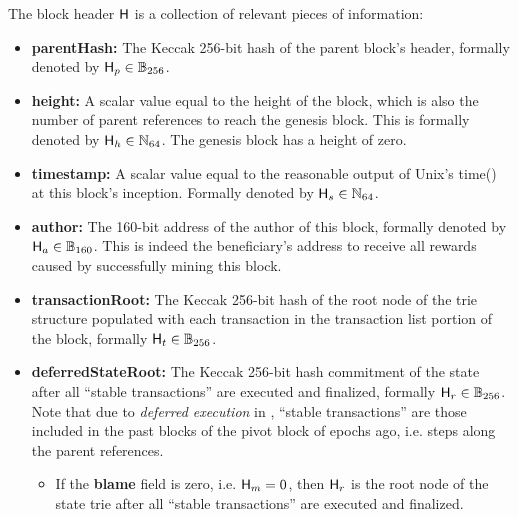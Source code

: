 The block header $\textsf{H}$ is a collection of relevant pieces of information:
\begin{itemize}[nosep]
	\item {\bf parentHash:} The Keccak 256-bit hash of the parent block's header, formally denoted by $\textsf{H}_p\in\mathbb{B}_{256}$.
	

	\item {\bf height:} A scalar value equal to the height of the block, which is also the number of parent references to reach the genesis block. 
	This is formally denoted by $\textsf{H}_h\in \mathbb{N}_{64}$.
	The genesis block has a height of zero. 
	
	\item {\bf timestamp:} A scalar value equal to the reasonable output of Unix's time() at this block's inception. Formally denoted by $\textsf{H}_s \in \mathbb{N}_{64}$. 

	\item {\bf author:} The 160-bit address of the author of this block, formally denoted by $\textsf{H}_a \in \mathbb{B}_{160}$. 
	This is indeed the beneficiary's address to receive all rewards caused by successfully mining this block.

	\item {\bf transactionRoot:} The Keccak 256-bit hash of the root node of the trie structure populated with each transaction in the transaction list portion of the block, formally $\textsf{H}_t\in\mathbb{B}_{256}$.



	\item {\bf deferredStateRoot:} The Keccak 256-bit hash commitment of the state after all ``stable transactions''  are executed and finalized, formally $\textsf{H}_r\in\mathbb{B}_{256}$.
	Note that due to \emph{deferred execution} in {\name},  ``stable transactions'' are those included in the past blocks of the pivot block of  epochs ago, i.e.  steps along the parent references.
	\begin{itemize}
		\item If the {\bf blame} field is zero, i.e. $\textsf{H}_m=0$, then $\textsf{H}_r$ is the root node of the state trie after all ``stable transactions''  are executed and finalized.
	

\end{itemize}
\end{itemize}
